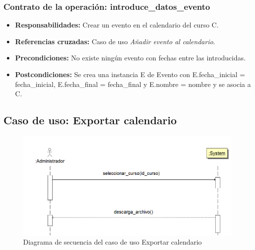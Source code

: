\documentclass{book}
\begin{document}
\subsubsection{Contrato de la operación: introduce\_datos\_evento}
\begin{itemize}
\item {\bf Responsabilidades:} Crear un evento en el calendario del curso C.
\item {\bf Referencias cruzadas:} Caso de uso {\em Añadir evento al calendario}.
\item {\bf Precondiciones:} No existe ningún evento con fechas entre las introducidas.
\item {\bf Postcondiciones:} Se crea una instancia E de Evento con E.fecha\_inicial = fecha\_inicial, E.fecha\_final = fecha\_final y E.nombre = nombre y se asocia a C.
\end{itemize}

\subsection{Caso de uso: Exportar calendario}
\begin{figure}[H] 
  \label{comportamiento-exportar-calendario} 
	\begin{center}
    \includegraphics[scale=0.5]{./secuencia-exportar-calendario.png}
  \end{center}
\caption{Diagrama de secuencia del caso de uso Exportar calendario}
\end{figure}
\end{document}
